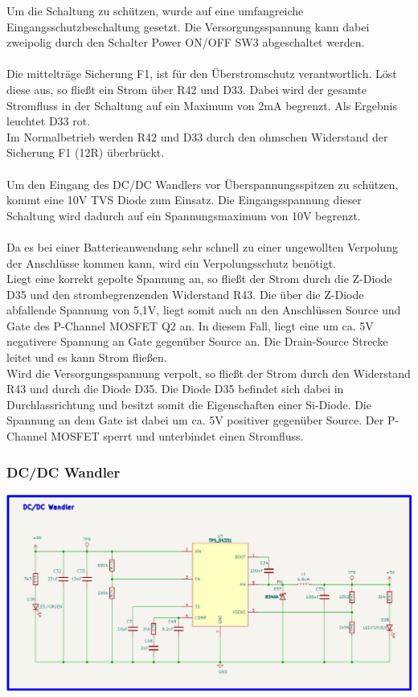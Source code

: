 Um die Schaltung zu schützen, wurde auf eine umfangreiche Eingangsschutzbeschaltung gesetzt. Die Versorgungsspannung kann dabei zweipolig durch den Schalter \glqq Power ON/OFF SW3 \grqq{} abgeschaltet werden.
\\
\\
Die mittelträge Sicherung F1, ist für den Überstromschutz verantwortlich. Löst diese aus, so fließt ein Strom über R42 und D33. Dabei wird der gesamte Stromfluss in der Schaltung auf ein Maximum von 2mA begrenzt. Als Ergebnis leuchtet D33 rot.
\\
Im Normalbetrieb werden R42 und D33 durch den ohmschen Widerstand der Sicherung F1 (12R) überbrückt.
\\
\\
Um den Eingang des DC/DC Wandlers vor Überspannungsspitzen zu schützen, kommt eine 10V TVS Diode zum Einsatz. Die Eingangsspannung dieser Schaltung wird dadurch auf ein Spannungsmaximum von 10V begrenzt. 
\\
\\
Da es bei einer Batterieanwendung sehr schnell zu einer ungewollten Verpolung der Anschlüsse kommen kann, wird ein Verpolungsschutz benötigt.
\\
Liegt eine korrekt gepolte Spannung an, so fließt der Strom durch die Z-Diode D35 und den strombegrenzenden Widerstand R43. Die über die Z-Diode abfallende Spannung von 5,1V, liegt somit auch an den Anschlüssen \glqq Source und Gate \grqq{} des P-Channel MOSFET Q2 an.
In diesem Fall, liegt eine um ca. 5V negativere Spannung an Gate gegenüber Source an. Die Drain-Source Strecke leitet und es kann Strom fließen.
\\ 
Wird die Versorgungsspannung verpolt, so fließt der Strom durch den Widerstand R43 und durch die Diode D35. Die Diode D35 befindet sich dabei in Durchlassrichtung und besitzt somit die Eigenschaften einer Si-Diode.
Die Spannung an dem Gate ist dabei um ca. 5V positiver gegenüber Source. Der P-Channel MOSFET sperrt und unterbindet einen Stromfluss.
\\

\subsubsection{DC/DC Wandler}

\begin{center}
\includegraphics[width=16cm]{Bilder/DCDCWandler.png}
\end{center}

